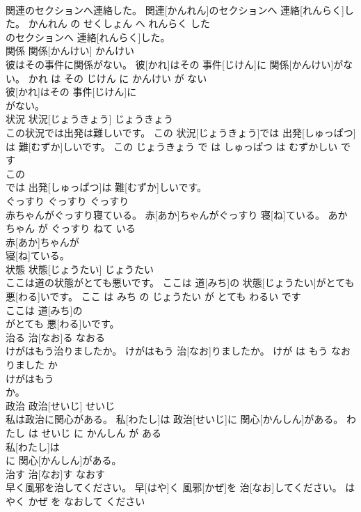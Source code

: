 \documentclass[8pt]{extreport}
\begin{document}
\begin{CJK}{UTF8}{min}
\\	関連のセクションへ連絡した。	関連[かんれん]のセクションへ 連絡[れんらく]した。	かんれん の せくしょん へ れんらく した	
\\	のセクションへ 連絡[れんらく]した。			
\\	関係	関係[かんけい]	かんけい	
\\	彼はその事件に関係がない。	彼[かれ]はその 事件[じけん]に 関係[かんけい]がない。	かれ は その じけん に かんけい が ない	
\\	彼[かれ]はその 事件[じけん]に
\\	がない。			
\\	状況	状況[じょうきょう]	じょうきょう	
\\	この状況では出発は難しいです。	この 状況[じょうきょう]では 出発[しゅっぱつ]は 難[むずか]しいです。	この じょうきょう で は しゅっぱつ は むずかしい です	
\\	この
\\	では 出発[しゅっぱつ]は 難[むずか]しいです。			
\\	ぐっすり	ぐっすり	ぐっすり	
\\	赤ちゃんがぐっすり寝ている。	赤[あか]ちゃんがぐっすり 寝[ね]ている。	あかちゃん が ぐっすり ねて いる	
\\	赤[あか]ちゃんが
\\	寝[ね]ている。			
\\	状態	状態[じょうたい]	じょうたい	
\\	ここは道の状態がとても悪いです。	ここは 道[みち]の 状態[じょうたい]がとても 悪[わる]いです。	ここ は みち の じょうたい が とても わるい です	
\\	ここは 道[みち]の
\\	がとても 悪[わる]いです。			
\\	治る	治[なお]る	なおる	
\\	けがはもう治りましたか。	けがはもう 治[なお]りましたか。	けが は もう なおりました か	
\\	けがはもう
\\	か。			
\\	政治	政治[せいじ]	せいじ	
\\	私は政治に関心がある。	私[わたし]は 政治[せいじ]に 関心[かんしん]がある。	わたし は せいじ に かんしん が ある	
\\	私[わたし]は
\\	に 関心[かんしん]がある。			
\\	治す	治[なお]す	なおす	
\\	早く風邪を治してください。	早[はや]く 風邪[かぜ]を 治[なお]してください。	はやく かぜ を なおして ください	

\end{CJK}
\end{document}

